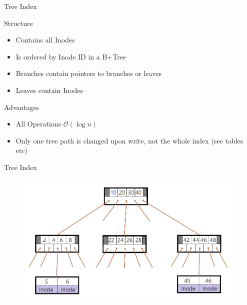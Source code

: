\documentclass[
	,footlinenumber
	,navline=true
	,footlineauthor
	,ngerman
	]{beamer}
\begin{document}
\begin{frame}{Tree Index}
\begin{block}{Structure}
	\begin{itemize}
		\item Contains all Inodes
		\item Is ordered by Inode ID in a B+Tree
		\item Branches contain pointers to branches or leaves
		\item Leaves contain Inodes
	\end{itemize}
\end{block}
\begin{block}{Advantages}
	\begin{itemize}
		\item All Operations $\mathcal{O}(\log n)$
		\item Only one tree path is changed upon write, not the whole index (see tables etc)
	\end{itemize}
\end{block}
\end{frame}

\begin{frame}{Tree Index}
	\begin{figure}[H]
		\centering
		\includegraphics[width=\textwidth]{../images/btree.png}
	\end{figure}
\end{frame}
\end{document}
